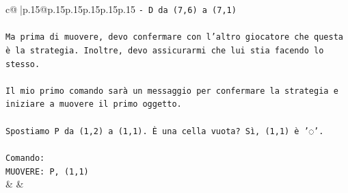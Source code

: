 \documentclass{article}
\begin{document}
{\begin{supertabular}{c@{$\;$}|p{.15\linewidth}@{}p{.15\linewidth}p{.15\linewidth}p{.15\linewidth}p{.15\linewidth}p{.15\linewidth}}
{{{\texttt{{-} D da (7,6) a (7,1)} \\
\\ 
\texttt{Ma prima di muovere, devo confermare con l'altro giocatore che questa è la strategia. Inoltre, devo assicurarmi che lui stia facendo lo stesso.} \\
\\ 
\texttt{Il mio primo comando sarà un messaggio per confermare la strategia e iniziare a muovere il primo oggetto.} \\
\\ 
\texttt{Spostiamo P da (1,2) a (1,1). È una cella vuota? Sì, (1,1) è '◌'.} \\
\\ 
\texttt{Comando:} \\
\texttt{MUOVERE: P, (1,1)} \\
            }
        }
    }
    & & \\ \\


\end{supertabular}}
\end{document}

